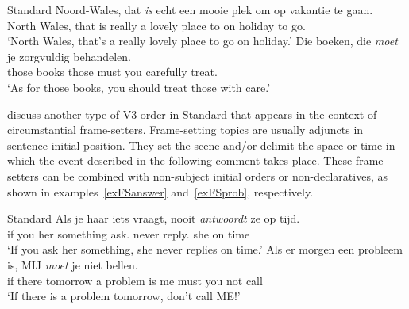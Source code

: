 \documentclass[output=paper]{langsci/langscibook}
\begin{document}
\ea Standard 
    \ea
    \gll\label{exHT-NW}Noord-Wales, dat \textit{is} echt een mooie plek om op vakantie te gaan.\\
    {North Wales}, that is really a lovely place to on holiday to go.\Inf{}\\
    \trans \enquote*{North Wales, that}s a really lovely place to go on holiday.'
    \ex
    \gll\label{exHT-boeken}Die boeken, die \textit{moet} je zorgvuldig behandelen.\\
    those books those must you carefully treat.\Inf{}\\
    \trans \enquote*{As for those books, you should treat those with care.}
    \z
\z

\noindent \citet{GrecoHaegeman2020} discuss another type of V3 order in Standard  that appears in the context of
circumstantial frame-setters.  Frame-setting topics are usually adjuncts in
sentence-initial position. They set the scene and/or delimit the space or time
in which the event described in the following comment takes place. These
frame-setters can be combined with non-subject initial orders or
non-declaratives, as shown in examples~\eqref{exFSanswer} and~\eqref{exFSprob},
respectively.

\ea Standard 
    \ea
    \gll\label{exFSanswer}Als je haar iets vraagt, nooit \textit{antwoordt} ze op tijd.\\
    if you her something ask.\Ssg{} never reply.\Tsg{} she on time\\
    \trans \enquote*{If you ask her something, she never replies on time.}
    \ex
    \gll\label{exFSprob}Als er morgen een probleem is, MIJ \textit{moet} je niet bellen.\\
    if there tomorrow a problem is me must you not call\\
    \trans \enquote*{If there is a problem tomorrow, don't call ME!}
    \z
\z
\end{document}
